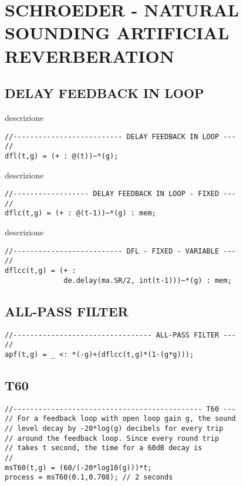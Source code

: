 \section*{SCHROEDER - NATURAL SOUNDING ARTIFICIAL REVERBERATION}

\subsection*{DELAY FEEDBACK IN LOOP}

descrizione

\begin{lstlisting}
//-------------------------- DELAY FEEDBACK IN LOOP ---
//
dfl(t,g) = (+ : @(t))~*(g);
\end{lstlisting}

descrizione

\begin{lstlisting}
//------------------ DELAY FEEDBACK IN LOOP - FIXED ---
//
dflc(t,g) = (+ : @(t-1))~*(g) : mem;
\end{lstlisting}

descrizione

\begin{lstlisting}
//-------------------------- DFL - FIXED - VARIABLE ---
//
dflcc(t,g) = (+ :
              de.delay(ma.SR/2, int(t-1)))~*(g) : mem;
\end{lstlisting}

\subsection*{ALL-PASS FILTER}

\begin{lstlisting}
//--------------------------------- ALL-PASS FILTER ---
//
apf(t,g) = _ <: *(-g)+(dflcc(t,g)*(1-(g*g)));
\end{lstlisting}

\subsection*{T60}
\begin{lstlisting}
//--------------------------------------------- T60 ---
// For a feedback loop with open loop gain g, the sound
// level decay by -20*log(g) decibels for every trip
// around the feedback loop. Since every round trip
// takes t second, the time for a 60dB decay is
//
msT60(t,g) = (60/(-20*log10(g)))*t;
process = msT60(0.1,0.708); // 2 seconds
\end{lstlisting}

